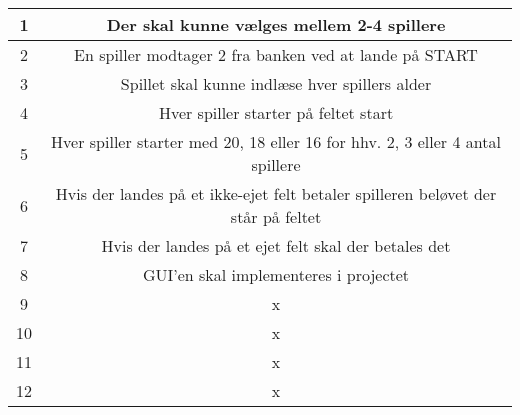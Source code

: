 







\begin{center}
\begin{tabular}{ | c | c | } 
\hline
1 & Der skal kunne vælges mellem 2-4 spillere \\ 
\hline
2 & En spiller modtager 2 fra banken ved at lande på START \\ 
\hline
3 & Spillet skal kunne indlæse hver spillers alder \\ 
\hline
4 & Hver spiller starter på feltet start \\ 
\hline
5 & Hver spiller starter med 20, 18 eller 16 for hhv. 2, 3 eller 4 antal spillere \\ 
\hline
6 & Hvis der landes på et ikke-ejet felt betaler spilleren beløvet der står på feltet \\ 
\hline
7 & Hvis der landes på et ejet felt skal der betales det \\ 
\hline
8 & GUI'en skal implementeres i projectet \\ 
\hline
9 & x \\ 
\hline
10 & x \\ 
\hline
11 & x \\ 
\hline
12 & x \\ 
\hline
\end{tabular}
\end{center}